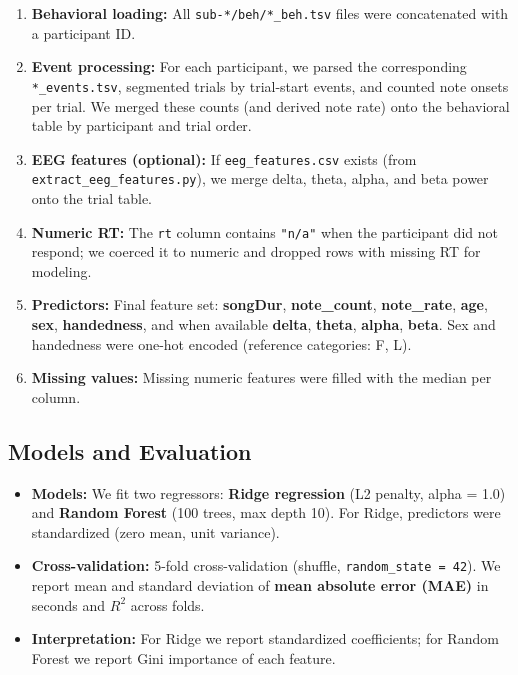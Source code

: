 \documentclass[11pt,a4paper]{article}
\begin{document}
\begin{enumerate}[leftmargin=*]
    \item \textbf{Behavioral loading:} All \texttt{sub-*/beh/*\_beh.tsv} files were concatenated with a participant ID.
    \item \textbf{Event processing:} For each participant, we parsed the corresponding \texttt{*\_events.tsv}, segmented trials by trial-start events, and counted note onsets per trial. We merged these counts (and derived note rate) onto the behavioral table by participant and trial order.
    \item \textbf{EEG features (optional):} If \texttt{eeg\_features.csv} exists (from \texttt{extract\_eeg\_features.py}), we merge delta, theta, alpha, and beta power onto the trial table.
    \item \textbf{Numeric RT:} The \texttt{rt} column contains \texttt{"n/a"} when the participant did not respond; we coerced it to numeric and dropped rows with missing RT for modeling.
    \item \textbf{Predictors:} Final feature set: \textbf{songDur}, \textbf{note\_count}, \textbf{note\_rate}, \textbf{age}, \textbf{sex}, \textbf{handedness}, and when available \textbf{delta}, \textbf{theta}, \textbf{alpha}, \textbf{beta}. Sex and handedness were one-hot encoded (reference categories: F, L).
    \item \textbf{Missing values:} Missing numeric features were filled with the median per column.
\end{enumerate}

\subsection{Models and Evaluation}

\begin{itemize}[leftmargin=*]
    \item \textbf{Models:} We fit two regressors: \textbf{Ridge regression} (L2 penalty, alpha = 1.0) and \textbf{Random Forest} (100 trees, max depth 10). For Ridge, predictors were standardized (zero mean, unit variance).
    \item \textbf{Cross-validation:} 5-fold cross-validation (shuffle, \texttt{random\_state = 42}). We report mean and standard deviation of \textbf{mean absolute error (MAE)} in seconds and \textbf{$R^2$} across folds.
    \item \textbf{Interpretation:} For Ridge we report standardized coefficients; for Random Forest we report Gini importance of each feature.
\end{itemize}
\end{document}
